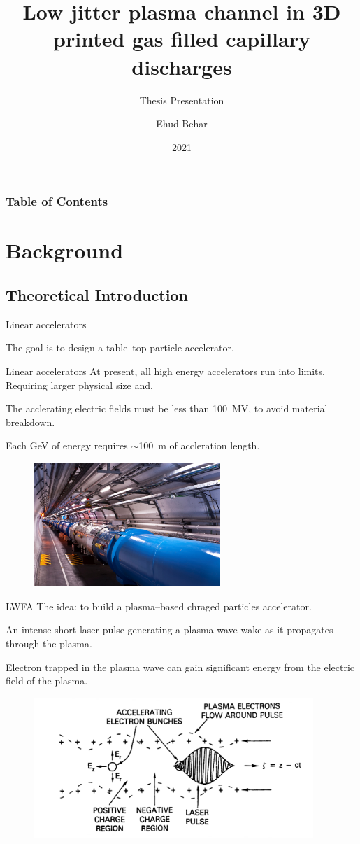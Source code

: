 \documentclass[]{beamer}
\title{Low jitter plasma channel in 3D printed gas filled capillary discharges}
\subtitle{Thesis Presentation}
\author{Ehud Behar}
\institute{Hebrew University of Jerusalem}
\date{2021}
\begin{document}
\frame{\titlepage}
\begin{frame}
\frametitle{Table of Contents}
\tableofcontents
\end{frame}

\section{Background}
\subsection{Theoretical Introduction}
  \begin{frame}{Linear accelerators}
  \begin{center}
    The goal is to design a table--top particle accelerator.
  \end{center}
  \end{frame}
  \begin{frame}{Linear accelerators}
    At present, all high energy accelerators run into limits.
    Requiring larger physical size and,

    The acclerating electric fields must be less than \SI{100}{\mega \V}, to avoid material breakdown.

    Each \si{\giga \eV} of energy requires $\sim$\SI{100}{\meter} of accleration length.
    \begin{figure}
      \includegraphics[width=200pt]{figures/theory/lhc_cern_compressed.jpg}
    \end{figure}
  \end{frame}
  \begin{frame}{LWFA}
  The idea: to build a plasma--based chraged particles accelerator.

  An intense short laser pulse generating a plasma wave wake as it propagates through the plasma.

  Electron trapped in the plasma wave can gain significant energy from the electric field of the plasma.
  \begin{figure}
    \includegraphics[width=300pt]{figures/theory/lwfa-schematic.PNG}
  \end{figure}
  \end{frame}
\end{document}
